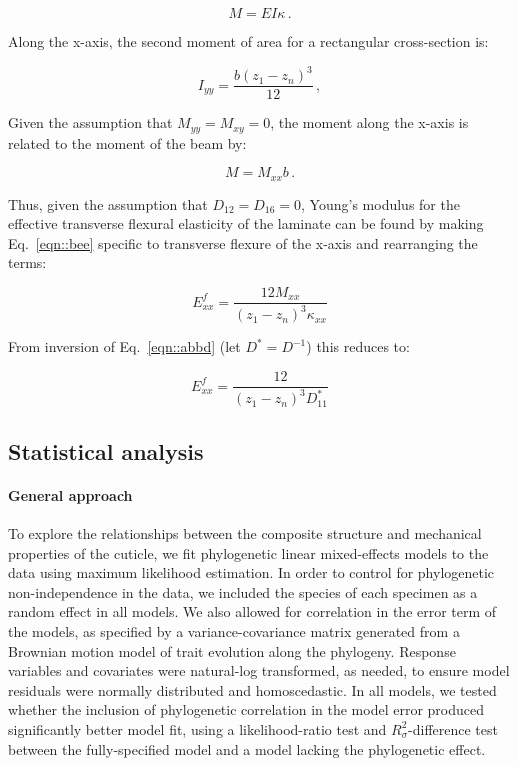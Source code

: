 \documentclass[twocolumn, linenumbers, superscriptaddress]{revtex4-1}
\begin{document}
				\begin{equation}
				\label{eqn::bee}
				M = EI\kappa\,.
				\end{equation}
				
				Along the x-axis, the second moment of area for a rectangular cross-section is:
				
				\begin{equation}
					I_{yy} = \frac{b(z_1 - z_n)^3}{12}\,,
				\end{equation}	
				
				Given the assumption that $M_{yy} = M_{xy} = 0$, the moment along the x-axis is related to the moment of the beam by:
				
				\begin{equation}
					M = M_{xx}b\,.
				\end{equation}
				
				Thus, given the assumption that $D_{12} = D_{16} = 0$, Young's modulus for the effective transverse flexural elasticity of the laminate can be found by making Eq.~\ref{eqn::bee} specific to transverse flexure of the x-axis and rearranging the terms:
				
				\begin{equation}
					E^f_{xx} = \frac{12M_{xx}}{(z_1 - z_n)^3\kappa_{xx}}
				\end{equation}
				
				From inversion of Eq.~\ref{eqn::abbd} (let $D^* = D^{-1}$) this reduces to:
				
				\begin{equation}
					E^f_{xx} = \frac{12}{(z_1 - z_n)^3D^*_{11}}
				\end{equation}
					
		\subsection*{Statistical analysis}
			\paragraph*{General approach}
				To explore the relationships between the composite structure and mechanical properties of the cuticle, we fit phylogenetic linear mixed-effects models to the data using maximum likelihood estimation.
				In order to control for phylogenetic non-independence in the data, we included the species of each specimen as a random effect in all models.
				We also allowed for correlation in the error term of the models, as specified by a variance-covariance matrix generated from a Brownian motion model of trait evolution along the phylogeny.
				Response variables and covariates were natural-log transformed, as needed, to ensure model residuals were normally distributed and homoscedastic.
				In all models, we tested whether the inclusion of phylogenetic correlation in the model error produced significantly better model fit, using a likelihood-ratio test and $R^{2}_{\sigma}$-difference test between the fully-specified model and a model lacking the phylogenetic effect.
\end{document}
